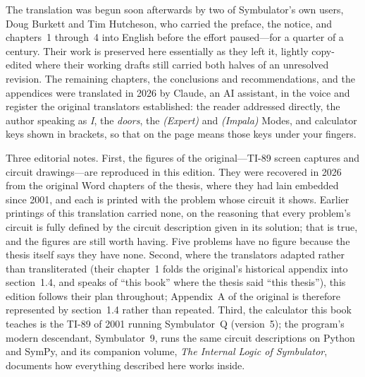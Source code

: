 \documentclass[11pt,oneside]{report}
\newcommand{\key}[1]{%
  \setlength{\fboxsep}{1.6pt}%
  \fbox{\footnotesize\textsf{#1}}}
\begin{document}
The translation was begun soon afterwards by two of Symbulator's own
users, Doug Burkett and Tim Hutcheson, who carried the preface, the
notice, and chapters~1 through~4 into English before the effort
paused---for a quarter of a century. Their work is preserved here
essentially as they left it, lightly copy-edited where their working
drafts still carried both halves of an unresolved revision. The
remaining chapters, the conclusions and recommendations, and the
appendices were translated in 2026 by Claude, an AI assistant, in
the voice and register the original translators established: the
reader addressed directly, the author speaking as \emph{I}, the
\emph{doors}, the \emph{(Expert)} and \emph{(Impala)} Modes, and
calculator keys shown in brackets, so that \key{2nd} \key{ENTER} on
the page means those keys under your fingers.

Three editorial notes. First, the figures of the original---TI-89
screen captures and circuit drawings---are reproduced in this edition.
They were recovered in 2026 from the original Word chapters of the
thesis, where they had lain embedded since 2001, and each is printed
with the problem whose circuit it shows. Earlier printings of this
translation carried none, on the reasoning that every problem's circuit
is fully defined by the circuit description given in its solution; that
is true, and the figures are still worth having. Five problems have no
figure because the thesis itself says they have none. Second, where the translators adapted rather
than transliterated (their chapter~1 folds the original's historical
appendix into section~1.4, and speaks of ``this book'' where the
thesis said ``this thesis''), this edition follows their plan
throughout; Appendix~A of the original is therefore represented by
section~1.4 rather than repeated. Third, the calculator this book
teaches is the TI-89 of 2001 running Symbulator~Q (version~5); the
program's modern descendant, Symbulator~9, runs the same circuit
descriptions on Python and SymPy, and its companion volume,
\emph{The Internal Logic of Symbulator}, documents how everything
described here works inside.

\tableofcontents















\end{document}
